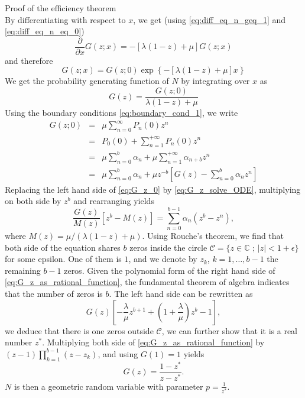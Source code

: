 \documentclass{beamer}
\begin{document}
\begin{frame}[allowframebreaks]{Proof of the efficiency theorem}
$$$$
By differentiating with respect to $x$, we get (using \eqref{eq:diff_eq_n_geq_1} and \eqref{eq:diff_eq_n_eq_0})
$$
\frac{\partial}{\partial x}G(z;x) = -\left[\lambda(1-z)+\mu\right]G(z;x)
$$
and therefore
$$
G(z;x) = G(z;0)\exp\left\{-\left[\lambda(1-z)+\mu\right]x\right\}
$$
We get the probability generating function of $N$ by integrating over $x$ as 
\begin{equation}\label{eq:G_z_solve_ODE}
G(z) = \frac{G(z;0)}{\lambda(1-z)+\mu}
\end{equation}
Using the boundary conditions \eqref{eq:boundary_cond_1}, we write 
\begin{eqnarray}
G(z;0) &= &\mu \sum_{n = 0}^\infty P_{n}(0)z^n \nonumber\\
&= &P_{0}(0)+\sum_{n=1}^{+\infty}P_{n}(0)z^n\nonumber\\
&=& \mu\sum_{n = 0}^{b}\alpha_n  + \mu\sum_{n=1}^{+\infty}\alpha_{n+b} z^n\nonumber\\
&=& \mu\sum_{n = 0}^{b}\alpha_n + \mu z^{-b}\left[G(z)-\sum_{n = 0}^{b}\alpha_n z^n\right]\label{eq:G_z_0}
\end{eqnarray}
Replacing the left hand side of \eqref{eq:G_z_0} by \eqref{eq:G_z_solve_ODE}, multiplying on both side by $z^b$ and rearranging yields 
\begin{equation}\label{eq:G_z_as_rational_function}
\frac{G(z)}{M(z)}[z^b - M(z)] =\sum_{n=0}^{b-1}\alpha_n(z^b - z^n), 
\end{equation}
where $M(z) = \mu/(\lambda(1-z)+\mu)$. Using Rouche's theorem, we find that both side of the equation shares $b$ zeros inside the circle $\mathcal{C} = \{z\in\mathbb{C}\text{ ; }|z| <1+\epsilon\}$ for some epsilon. One of them is $1$, and we denote by $z_k$, $k = 1,\ldots, b-1$ the remaining $b-1$ zeros. Given the polynomial form of the right hand side of \eqref{eq:G_z_as_rational_function}, the fundamental theorem of algebra indicates that the number of zeros is $b$. The left hand side can be rewritten as
$$
G(z)\left[-\frac{\lambda}{\mu}z^{b+1} + \left(1 + \frac{\lambda}{\mu}\right)z^b -1\right],
$$
we deduce that there is one zeros outside $\mathcal{C}$, we can further show that it is a real number $z^\ast$. Multiplying both side of \eqref{eq:G_z_as_rational_function} by $(z-1)\prod_{k =1}^{b-1}(z-z_k)$, and using $G(1)=1$ yields
$$
G(z) = \frac{1-z^\ast}{z-z^{\ast}}.
$$
$N$ is then a geometric random variable with parameter $p = \frac{1}{z^\ast}.$
\end{frame}
\end{document}

